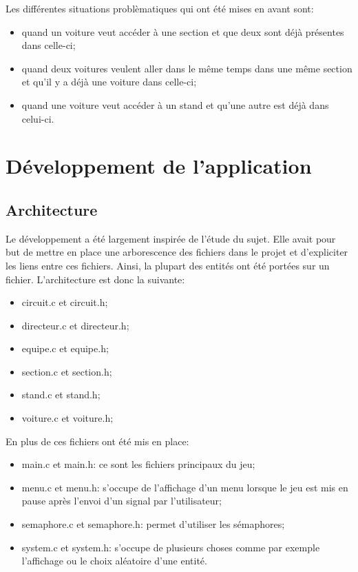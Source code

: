 \documentclass[a4paper, 11pt]{report}
\begin{document}
		Les différentes situations problèmatiques qui ont été mises en avant sont:
		\begin{itemize}
			\item quand un voiture veut accéder à une section et que deux sont déjà présentes dans celle-ci;
			\item quand deux voitures veulent aller dans le même temps dans une même section et qu'il y a déjà une voiture dans celle-ci;
			\item quand une voiture veut accéder à un stand et qu'une autre est déjà dans celui-ci.\\
		\end{itemize}
				

		\section{Développement de l'application}
		
			\subsection{Architecture}
		
		Le développement a été largement inspirée de l'étude du sujet. Elle avait pour but de mettre en place une arborescence des fichiers dans le projet et d'expliciter les liens entre ces fichiers. Ainsi, la plupart des entités ont été portées sur un fichier. L'architecture est donc la suivante:
		\begin{itemize}
			\item circuit.c et circuit.h;
			\item directeur.c et directeur.h;
			\item equipe.c et equipe.h;
			\item section.c et section.h;
			\item stand.c et stand.h;
			\item voiture.c et voiture.h;
		\end{itemize}
		
		En plus de ces fichiers ont été mis en place:
		\begin{itemize}
			\item main.c et main.h: ce sont les fichiers principaux du jeu;
			\item menu.c et menu.h: s'occupe de l'affichage d'un menu lorsque le jeu est mis en pause après l'envoi d'un signal par l'utilisateur;
			\item semaphore.c et semaphore.h: permet d'utiliser les sémaphores;
			\item system.c et system.h: s'occupe de plusieurs choses comme par exemple l'affichage ou le choix aléatoire d'une entité.\\
		\end{itemize}
		
\end{document}
